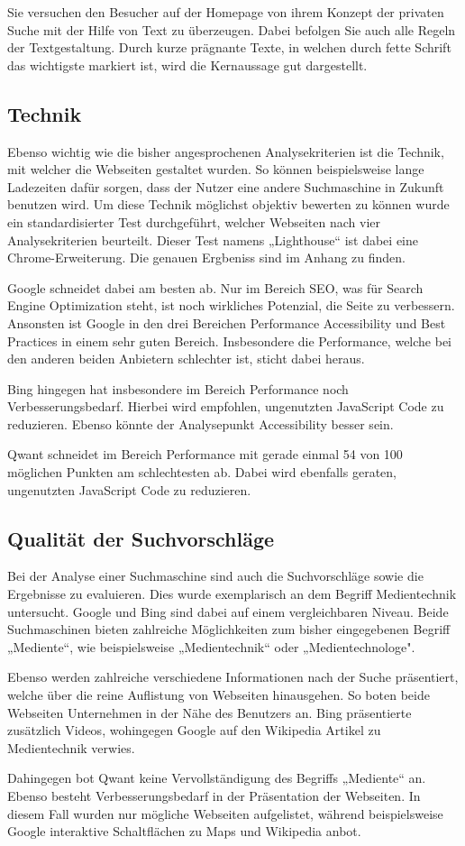 Sie versuchen den Besucher auf der Homepage von ihrem Konzept der privaten Suche mit der Hilfe von
Text zu überzeugen. Dabei befolgen Sie auch alle Regeln der Textgestaltung\autocite[Seite 5ff]{Maulhardt.20220621b}. Durch kurze prägnante Texte,
in welchen durch fette Schrift das wichtigste markiert ist, wird die Kernaussage gut dargestellt.

\subsection{Technik}
Ebenso wichtig wie die bisher angesprochenen Analysekriterien ist die Technik, mit welcher die Webseiten gestaltet wurden.
So können beispielsweise lange Ladezeiten dafür sorgen, dass der Nutzer eine andere Suchmaschine in Zukunft benutzen wird.
Um diese Technik möglichst objektiv bewerten zu können wurde ein standardisierter Test durchgeführt, welcher Webseiten nach
vier Analysekriterien beurteilt. Dieser Test namens „Lighthouse“ ist dabei eine Chrome-Erweiterung. Die genauen Ergbeniss
sind im Anhang zu finden.

Google schneidet dabei am besten ab. Nur im Bereich SEO, was für Search Engine Optimization steht, ist noch wirkliches
Potenzial, die Seite zu verbessern. Ansonsten ist Google in den drei Bereichen Performance Accessibility und Best Practices
in einem sehr guten Bereich. Insbesondere die Performance, welche bei den anderen beiden Anbietern schlechter ist,
sticht dabei heraus.

Bing hingegen hat insbesondere im Bereich Performance noch Verbesserungsbedarf. Hierbei wird empfohlen, ungenutzten JavaScript
Code zu reduzieren. Ebenso könnte der Analysepunkt Accessibility besser sein.

Qwant schneidet im Bereich Performance mit gerade einmal 54 von 100 möglichen Punkten am schlechtesten ab. Dabei wird ebenfalls
geraten, ungenutzten JavaScript Code zu reduzieren.

\subsection{Qualität der Suchvorschläge}
Bei der Analyse einer Suchmaschine sind auch die Suchvorschläge sowie die Ergebnisse zu evaluieren. Dies wurde exemplarisch
an dem Begriff Medientechnik untersucht. Google und Bing sind dabei auf einem vergleichbaren Niveau. Beide Suchmaschinen
bieten zahlreiche Möglichkeiten zum bisher eingegebenen Begriff „Mediente“, wie beispielsweise „Medientechnik“ oder „Medientechnologe".

Ebenso werden zahlreiche verschiedene Informationen nach der Suche präsentiert, welche über die reine Auflistung von Webseiten hinausgehen.
So boten beide Webseiten Unternehmen in der Nähe des Benutzers an.
Bing präsentierte zusätzlich Videos, wohingegen Google auf den Wikipedia Artikel zu Medientechnik verwies.

Dahingegen bot Qwant keine Vervollständigung des Begriffs „Mediente“ an. Ebenso besteht Verbesserungsbedarf in der Präsentation
der Webseiten. In diesem Fall wurden nur mögliche Webseiten aufgelistet, während beispielsweise Google
interaktive Schaltflächen zu Maps und Wikipedia anbot.